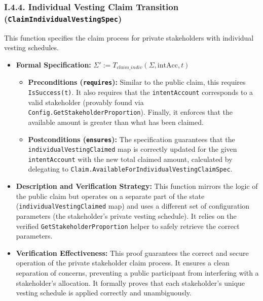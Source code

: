 \documentclass[
  english,
  onecolumn]{article}
\providecommand{\tightlist}{%
  \setlength{\itemsep}{0pt}\setlength{\parskip}{0pt}}
\begin{document}
\subsubsection{\texorpdfstring{I.4.4. Individual Vesting Claim
Transition
(\texttt{ClaimIndividualVestingSpec})}{I.4.4. Individual Vesting Claim Transition (ClaimIndividualVestingSpec)}}\label{i.4.4.-individual-vesting-claim-transition-claimindividualvestingspec}

This function specifies the claim process for private stakeholders with
individual vesting schedules.

\begin{itemize}
\tightlist
\item
  \textbf{Formal Specification:}
  \(\Sigma' := T_{claim\_indiv}(\Sigma, \text{intAcc}, t)\)

  \begin{itemize}
  \tightlist
  \item
    \textbf{Preconditions (\texttt{requires}):} Similar to the public
    claim, this requires \texttt{IsSuccess(t)}. It also requires that
    the \texttt{intentAccount} corresponds to a valid stakeholder
    (provably found via \texttt{Config.GetStakeholderProportion}).
    Finally, it enforces that the available amount is greater than what
    has been claimed.
  \item
    \textbf{Postconditions (\texttt{ensures}):} The specification
    guarantees that the \texttt{individualVestingClaimed} map is
    correctly updated for the given \texttt{intentAccount} with the new
    total claimed amount, calculated by delegating to
    \texttt{Claim.AvailableForIndividualVestingClaimSpec}.
  \end{itemize}
\item
  \textbf{Description and Verification Strategy:} This function mirrors
  the logic of the public claim but operates on a separate part of the
  state (\texttt{individualVestingClaimed} map) and uses a different set
  of configuration parameters (the stakeholder's private vesting
  schedule). It relies on the verified \texttt{GetStakeholderProportion}
  helper to safely retrieve the correct parameters.
\item
  \textbf{Verification Effectiveness:} This proof guarantees the correct
  and secure operation of the private stakeholder claim process. It
  ensures a clean separation of concerns, preventing a public
  participant from interfering with a stakeholder's allocation. It
  formally proves that each stakeholder's unique vesting schedule is
  applied correctly and unambiguously.
\end{itemize}
\end{document}
